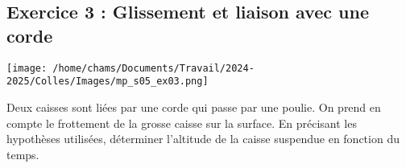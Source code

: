 \subsection{Exercice 3 : Glissement et liaison avec une corde}

\begin{minipage}[c]{\linewidth/2}
	\texttt{[image: /home/chams/Documents/Travail/2024-2025/Colles/Images/mp\_s05\_ex03.png]}
\end{minipage}%
\begin{minipage}[c]{\linewidth/2}
	Deux caisses sont liées par une corde qui passe par une poulie. On prend en compte le frottement de la grosse caisse sur la surface. En précisant les hypothèses utilisées, déterminer l'altitude de la caisse suspendue en fonction du temps.
\end{minipage}


